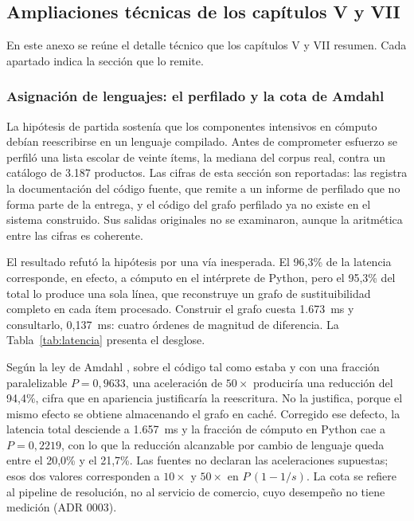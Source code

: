 \subsection{Ampliaciones técnicas de los capítulos V y VII}
\label{anx:ampliaciones}

En este anexo se reúne el detalle técnico que los capítulos V y VII resumen. Cada apartado indica la sección que lo remite.

\subsubsection{Asignación de lenguajes: el perfilado y la cota de Amdahl}

La hipótesis de partida sostenía que los componentes intensivos en cómputo debían
reescribirse en un lenguaje compilado. Antes de comprometer esfuerzo se perfiló una lista
escolar de veinte ítems, la mediana del corpus real, contra un catálogo de 3.187 productos.
Las cifras de esta sección son reportadas: las registra la documentación del código fuente,
que remite a un informe de perfilado que no forma parte de la entrega, y el código del grafo
perfilado ya no existe en el sistema construido. Sus salidas originales no se examinaron,
aunque la aritmética entre las cifras es coherente.

El resultado refutó la hipótesis por una vía inesperada. El 96,3\% de la latencia
corresponde, en efecto, a cómputo en el intérprete de Python, pero el 95,3\% del total lo
produce una sola línea, que reconstruye un grafo de sustituibilidad completo en cada ítem
procesado. Construir el grafo cuesta 1.673~ms y consultarlo, 0,137~ms: cuatro órdenes de
magnitud de diferencia. La Tabla~\ref{tab:latencia} presenta el desglose.



Según la ley de Amdahl \citep{amdahl_validity_1967}, sobre el código tal como estaba y con
una fracción paralelizable $P = 0{,}9633$, una aceleración de $50\times$ produciría una
reducción del 94,4\%, cifra que en apariencia justificaría la reescritura. No la justifica,
porque el mismo efecto se obtiene almacenando el grafo en caché. Corregido ese defecto, la
latencia total desciende a 1.657~ms y la fracción de cómputo en Python cae a
$P = 0{,}2219$, con lo que la reducción alcanzable por cambio de lenguaje queda entre el
20,0\% y el 21,7\%. Las fuentes no declaran las aceleraciones supuestas; esos dos valores
corresponden a $10\times$ y $50\times$ en $P\,(1 - 1/s)$. La cota se refiere al pipeline de
resolución, no al servicio de comercio, cuyo desempeño no tiene medición (ADR 0003).

